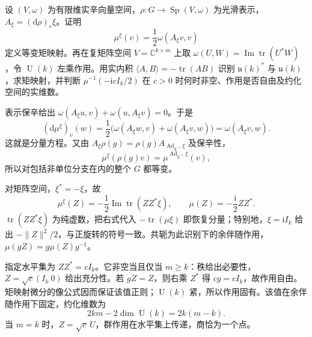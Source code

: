\BookExercises
\begin{exercise}\label{g4:ex:1001:quadratic-representation}
	设 \((V,\omega)\) 为有限维实辛向量空间，\(\rho:G\to\operatorname{Sp}(V,\omega)\) 为光滑表示，\(A_\xi=(\mathrm{d}\rho)_e\xi\)。证明
	\[
		\mu^\xi(v)=\frac12\omega(A_\xi v,v)
	\]
	定义等变矩映射。再在复矩阵空间 \(V=\mathbb C^{k\times m}\) 上取 \(\omega(U,W)=\operatorname{Im}\operatorname{tr}(U^*W)\)，令 \(\operatorname{U}(k)\) 左乘作用。用实内积 \(\langle A,B\rangle=-\operatorname{tr}(AB)\) 识别 \(\mathfrak u(k)^*\) 与 \(\mathfrak u(k)\)，求矩映射，并判断 \(\mu^{-1}(-\mathrm{i}cI_k/2)\) 在 \(c>0\) 时何时非空、作用是否自由及约化空间的实维数。
\end{exercise}
\begin{solution}
	表示保辛给出 \(\omega(A_\xi u,v)+\omega(u,A_\xi v)=0\)。于是
	\[
		(\mathrm{d}\mu^\xi)_v(w)
		=\frac12\bigl(\omega(A_\xi w,v)+\omega(A_\xi v,w)\bigr)
		=\omega(A_\xi v,w).
	\]
	这就是分量方程。又由 \(A_\xi\rho(g)=\rho(g)A_{\operatorname{Ad}_{g^{-1}}\xi}\) 及保辛性，
	\[
		\mu^\xi(\rho(g)v)=\mu^{\operatorname{Ad}_{g^{-1}}\xi}(v),
	\]
	所以对包括非单位分支在内的整个 \(G\) 都等变。

	对矩阵空间，\(\xi^*=-\xi\)，故
	\[
		\mu^\xi(Z)=-\frac12\operatorname{Im}\operatorname{tr}(ZZ^*\xi),
		\qquad \mu(Z)=-\frac{\mathrm{i}}2ZZ^*.
	\]
	\(\operatorname{tr}(ZZ^*\xi)\) 为纯虚数，把右式代入 \(-\operatorname{tr}(\mu\xi)\) 即恢复分量；特别地，\(\xi=\mathrm{i}I_k\) 给出 \(-\|Z\|^2/2\)，与正旋转的符号一致。共轭为此识别下的余伴随作用，\(\mu(gZ)=g\mu(Z)g^{-1}\)。

	指定水平集为 \(ZZ^*=cI_k\)。它非空当且仅当 \(m\ge k\)：秩给出必要性，\(Z=\sqrt c(I_k\ 0)\) 给出充分性。若 \(gZ=Z\)，则右乘 \(Z^*\) 得 \(cg=cI_k\)，故作用自由。矩映射微分的像公式因而保证该值正则；\(\operatorname{U}(k)\) 紧，所以作用固有。该值在余伴随作用下固定，约化维数为
	\[
		2km-2\dim\operatorname{U}(k)=2k(m-k).
	\]
	当 \(m=k\) 时，\(Z=\sqrt c\,U\)，群作用在水平集上传递，商恰为一个点。
\end{solution}

